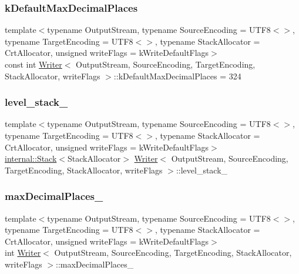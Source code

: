 \subsubsection{\texorpdfstring{k\+Default\+Max\+Decimal\+Places}{kDefaultMaxDecimalPlaces}}
{\footnotesize\ttfamily template$<$typename Output\+Stream, typename Source\+Encoding = U\+T\+F8$<$$>$, typename Target\+Encoding = U\+T\+F8$<$$>$, typename Stack\+Allocator = Crt\+Allocator, unsigned write\+Flags = k\+Write\+Default\+Flags$>$ \\
const int \hyperlink{classWriter}{Writer}$<$ Output\+Stream, Source\+Encoding, Target\+Encoding, Stack\+Allocator, write\+Flags $>$\+::k\+Default\+Max\+Decimal\+Places = 324\hspace{0.3cm}{\ttfamily [static]}}

\mbox{\label{classWriter_a9e6c13c06fc721dfd8486f17b9ff29de}} 
\subsubsection{\texorpdfstring{level\+\_\+stack\+\_\+}{level\_stack\_}}
{\footnotesize\ttfamily template$<$typename Output\+Stream, typename Source\+Encoding = U\+T\+F8$<$$>$, typename Target\+Encoding = U\+T\+F8$<$$>$, typename Stack\+Allocator = Crt\+Allocator, unsigned write\+Flags = k\+Write\+Default\+Flags$>$ \\
\hyperlink{classinternal_1_1Stack}{internal\+::\+Stack}$<$Stack\+Allocator$>$ \hyperlink{classWriter}{Writer}$<$ Output\+Stream, Source\+Encoding, Target\+Encoding, Stack\+Allocator, write\+Flags $>$\+::level\+\_\+stack\+\_\+\hspace{0.3cm}{\ttfamily [protected]}}

\mbox{\label{classWriter_a3d4ef664c3cdf34a286b13d27adcdd4d}} 
\subsubsection{\texorpdfstring{max\+Decimal\+Places\+\_\+}{maxDecimalPlaces\_}}
{\footnotesize\ttfamily template$<$typename Output\+Stream, typename Source\+Encoding = U\+T\+F8$<$$>$, typename Target\+Encoding = U\+T\+F8$<$$>$, typename Stack\+Allocator = Crt\+Allocator, unsigned write\+Flags = k\+Write\+Default\+Flags$>$ \\
int \hyperlink{classWriter}{Writer}$<$ Output\+Stream, Source\+Encoding, Target\+Encoding, Stack\+Allocator, write\+Flags $>$\+::max\+Decimal\+Places\+\_\+\hspace{0.3cm}{\ttfamily [protected]}}

